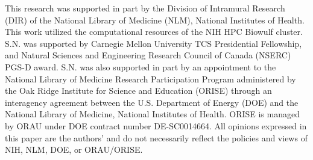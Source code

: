 This research was supported in part by the Division of Intramural Research (DIR) of the National Library of Medicine (NLM), National Institutes of Health.
This work utilized the computational resources of the NIH HPC Biowulf cluster.
S.N. was supported by Carnegie Mellon University TCS Presidential Fellowship, and Natural Sciences and Engineering Research Council of Canada (NSERC) PGS-D award.
S.N. was also supported in part by an appointment to the National Library of Medicine Research Participation Program administered by the Oak Ridge Institute for Science and Education (ORISE) through an interagency agreement between the U.S. Department of Energy (DOE) and the National Library of Medicine, National Institutes of Health.
ORISE is managed by ORAU under DOE contract number DE-SC0014664.
All opinions expressed in this paper are the authors' and do not necessarily reflect the policies and views of NIH, NLM, DOE, or ORAU/ORISE.
